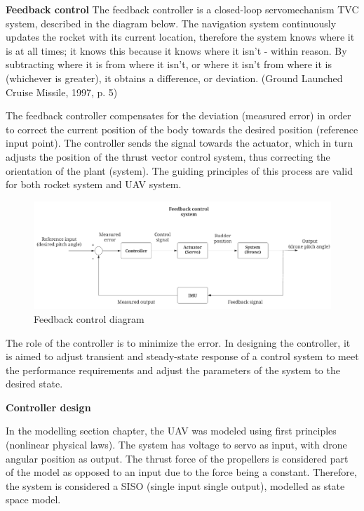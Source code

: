 \textbf{Feedback control}
The feedback controller is a closed-loop servomechanism TVC system, described in the diagram below. 
The navigation system continuously updates the rocket with its current location, therefore the system knows where it is at all times; it knows this because it knows where it isn't - within reason. By subtracting where it is from where it isn't, or where it isn't from where it is (whichever is greater), it obtains a difference, or deviation. (Ground Launched Cruise Missile, 1997, p. 5) \cite{victors_1997}

The feedback controller compensates for the deviation (measured error) in order to correct the current position of the body towards the desired position (reference input point). The controller sends the signal towards the actuator, which in turn adjusts the position of the thrust vector control system, thus correcting the orientation of the plant (system). The guiding principles of this process are valid for both rocket system and UAV system. 


\begin{figure}[h!]
  \includegraphics[scale=0.5]{graphics/Feedback.png}
  \caption{Feedback control diagram}
  \label{Feedback control diagram}
\end{figure}


The role of the controller is to minimize the error. In designing the controller, it is aimed to adjust transient and steady-state response of a control system to meet the performance requirements and adjust the parameters of the system to the desired state. \cite{yanushevsky2018modern} 

\textbf{Controller design}

In the modelling section chapter, the UAV was modeled using first principles (nonlinear physical laws).
The system has voltage to servo as input, with drone angular position as output. The thrust force of the propellers is considered part of the model as opposed to an input due to the force being a constant. 
Therefore, the system is considered a SISO (single input single output), modelled as state space model.


